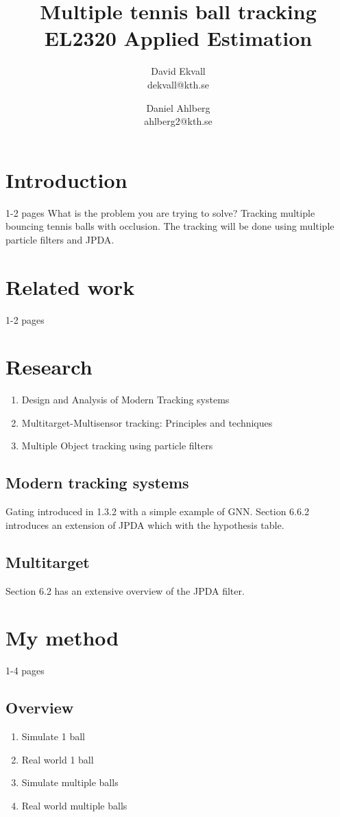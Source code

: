 \documentclass[a4paper,11pt]{article}
\title{
	Multiple tennis ball tracking\\
	EL2320 Applied Estimation
}
\author{
	David Ekvall\\
	dekvall@kth.se\\
	\and
	Daniel Ahlberg\\
	ahlberg2@kth.se\\
}
\begin{document}
\maketitle
{}

\section{Introduction}
1-2 pages
What is the problem you are trying to solve?
Tracking multiple bouncing tennis balls with occlusion. The tracking will be done using multiple particle filters and JPDA\cite{jaward2006multiple}.

\section{Related work}
1-2 pages \cite{reed2016generative}
\section{Research}
\begin{enumerate}
	\item Design and Analysis of Modern Tracking systems
	\item Multitarget-Multisensor tracking: Principles and techniques
	\item Multiple Object tracking using particle filters
\end{enumerate}

\subsection{Modern tracking systems}
Gating introduced in 1.3.2 with a simple example of GNN.
Section 6.6.2 introduces an extension of JPDA which with the hypothesis table.

\subsection{Multitarget}
Section 6.2 has an extensive overview of the JPDA filter.

\section{My method}
1-4 pages
\subsection{Overview}
\begin{enumerate}
	\item Simulate 1 ball
	\item Real world 1 ball
	\item Simulate multiple balls
	\item Real world multiple balls
\end{enumerate}
\end{document}

